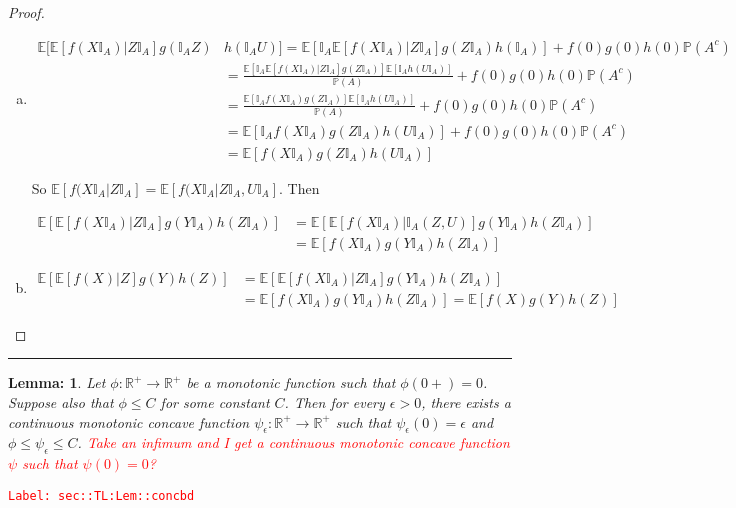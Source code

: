 \documentclass[12pt]{article}
\newcommand{\mb}{\mathbb}
\newcommand{\ra}{\rightarrow}
\newcommand{\ep}{\epsilon}
\newcommand{\tr}{\textcolor{red}}
\newcommand{\labe}[1]{\tr{\texttt{Label: #1}}}
\newcommand{\lin}{\rule{\linewidth}{0.4 pt}}
\newcommand{\pr}{\mb{P}}							%
\newcommand{\ex}[1]{\mb{E}\left[#1\right]}			%
\newtheorem{lem}[thms]{Lemma: }
\begin{document}
\begin{proof}
\begin{enumerate}[(a)]
By linearity, this also holds for all bounded and measurable \(f,g\) and \(h\) with no restrictions on \(f(0),g(0),h(0)\), so the proof is complete.

\item 

\begin{align*}
\mb{E}\bigg[\ex{f(X\mb{I}_A)| Z\mb{I}_A}g(\mb{I}_AZ)&h(\mb{I}_AU)\bigg] = \ex{\mb{I}_A\ex{f(X\mb{I}_A)|Z\mb{I}_A}g(Z\mb{I}_A)h(\mb{I}_A)} + f(0)g(0)h(0)\pr(A^c)\\
&=\frac{\ex{\mb{I}_A\ex{f(X\mb{I}_A)|Z\mb{I}_A}g(Z\mb{I}_A)}\ex{\mb{I}_Ah(U\mb{I}_A)}}{\pr(A)} + f(0)g(0)h(0)\pr(A^c)\\
&=\frac{\ex{\mb{I}_Af(X\mb{I}_A)g(Z\mb{I}_A)}\ex{\mb{I}_Ah(U\mb{I}_A)}}{\pr(A)} + f(0)g(0)h(0)\pr(A^c)\\
&=\ex{\mb{I}_Af(X\mb{I}_A)g(Z\mb{I}_A)h(U\mb{I}_A)} + f(0)g(0)h(0)\pr(A^c)\\
&= \ex{f(X\mb{I}_A)g(Z\mb{I}_A)h(U\mb{I}_A)}
\end{align*}

So \(\ex{f(X\mb{I}_A|Z\mb{I}_A} = \ex{f(X\mb{I}_A|Z\mb{I}_A,U\mb{I}_A}\). Then 

\begin{align*}
\ex{\ex{f(X\mb{I}_A)|Z\mb{I}_A}g(Y\mb{I}_A)h(Z\mb{I}_A)} &= \ex{\ex{f(X\mb{I}_A)|\mb{I}_A(Z,U)}g(Y\mb{I}_A)h(Z\mb{I}_A)}\\
&=\ex{f(X\mb{I}_A)g(Y\mb{I}_A)h(Z\mb{I}_A)}
\end{align*}

\item 
\begin{align*}
\ex{\ex{f(X)|Z}g(Y)h(Z)} &= \ex{\ex{f(X\mb{I}_A)|Z\mb{I}_A}g(Y\mb{I}_A)h(Z\mb{I}_A)}\\
&= \ex{f(X\mb{I}_A)g(Y\mb{I}_A)h(Z\mb{I}_A)} = \ex{f(X)g(Y)h(Z)}
\end{align*}
\end{enumerate}
\end{proof}

\lin

\begin{lem}
Let \(\phi: \mb{R}^+ \ra \mb{R}^+\) be a monotonic function such that \(\phi(0+) = 0\). Suppose also that \(\phi \leq C\) for some constant \(C\). Then for every \(\ep > 0\), there exists a continuous monotonic concave function \(\psi_\ep:\mb{R}^+\ra \mb{R}^+\) such that \(\psi_\ep(0) = \ep\) and \(\phi \leq \psi_\ep\leq C\). \tr{Take an infimum and I get a continuous monotonic concave function \(\psi\) such that \(\psi(0) = 0\)?}
\label{sec::TL:Lem::concbd}
\end{lem}
\labe{sec::TL:Lem::concbd}
\end{document}

